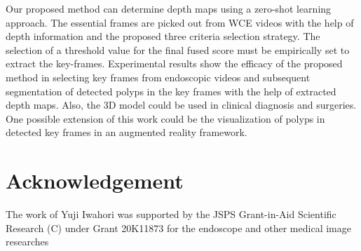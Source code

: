 \documentclass[journal]{IEEEtran}
\begin{document}
Our proposed method can determine depth maps using a zero-shot learning approach. 
The essential frames are picked out from WCE videos with the help of depth information and the proposed three criteria selection strategy. The selection of a threshold value for the final fused score must be empirically set to extract the key-frames. Experimental results show the efficacy of the proposed method in selecting key frames from endoscopic videos and subsequent segmentation of detected polyps in the key frames with the help of extracted depth maps.
Also, the 3D model could be used in clinical diagnosis and surgeries.
One possible extension of this work could be the visualization of polyps in detected key frames in an augmented reality framework.

\section*{Acknowledgement}
The work of Yuji Iwahori was supported by the JSPS Grant-in-Aid Scientific Research (C) under Grant 20K11873 for the endoscope and other medical image researches





 
 
 
\end{document}
